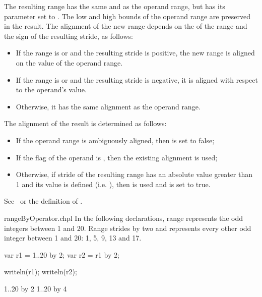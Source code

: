 The resulting range has the same  and  as the
operand range, but has its  parameter set to .
The low and high bounds of the operand range are preserved in the result.
The alignment of the new range depends on the  of the range
and the sign of the resulting stride, as follows:
\begin{itemize}
\item If the range is  or  and  the resulting stride is positive, the new range is aligned on
the  value of the operand range.  
\item If the range
is  or  and  the resulting stride is
negative, it is aligned with respect to the operand's  value.
\item Otherwise, it has the same alignment as the operand range.
\end{itemize}

The alignment of the result is determined as follows:
\begin{itemize}
\item If the operand range is ambiguously aligned, then  is set to
false;
\item If the  flag of the operand is , then the
existing alignment is used; 
\item Otherwise, if stride of the resulting range has an absolute value greater
than 1 and its  value is defined (i.e.
), then  is used and  is set
to true.
\end{itemize}
See~ or the definition of .

\begin{chapelexample}{rangeByOperator.chpl}
In the following declarations, range  represents the odd integers
between 1 and 20. Range  strides  by two and represents
every other odd integer between 1 and 20: 1, 5, 9, 13 and 17.
\begin{chapel}
var r1 = 1..20 by 2;
var r2 = r1 by 2;
\end{chapel}
\begin{chapelpost}
writeln(r1);
writeln(r2);
\end{chapelpost}
\begin{chapeloutput}
1..20 by 2
1..20 by 4
\end{chapeloutput}
\end{chapelexample}

